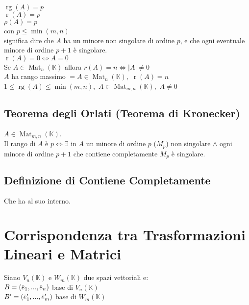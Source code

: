 \documentclass[a4paper, twoside, italian, 11pt]{book}
\newcommand{\detm}[1] {\left | #1 \right |}
\newcommand{\overbar}[1] {\mkern 1.5mu\overline{\mkern-1.5mu#1\mkern-1.5mu}\mkern 1.5mu}
\DeclareMathOperator{\Mat}{Mat}
\DeclareMathOperator{\rg}{rg}
\DeclareMathOperator{\mr}{r}
\newcommand{\K}{\mathbb K}
\begin{document}
\noindent
$\rg(A) = p$ \\
$\mr(A) = p$ \\
$\rho(A) = p$ \\

\noindent
con $p \leq \min(m, n)$ \\

\noindent
significa dire che $A$ ha un minore non singolare di ordine $p$, e che ogni eventuale minore di ordine $p + 1$ è singolare. \\

\noindent
$\mr(A) = 0 \iff A = \underline{0}$ \\

\noindent
Se $A \in \Mat_n(\K)$ allora $r(A) = n \iff \detm A \neq 0$ \\

\noindent
$A$ ha rango massimo $= A \in \Mat_n(\K),$ $\mr(A) = n$ \\

\noindent
$1 \leq \rg(A) \leq \min(m,n),$ $A \in \Mat_{m,n}(\K),$ $A \neq \underline{0}$


\subsection{Teorema degli Orlati (Teorema di Kronecker)}

$A \in \Mat_{m,n}(\K)$.\\
Il rango di $A$ è $p \iff \exists$ in $A$ un minore di ordine $p$ ($M_p$) non singolare $\land$ ogni minore di ordine $p + 1$ che contiene completamente $M_p$ è singolare.


\subsection{Definizione di Contiene Completamente}
Che ha al suo interno.



\section{Corrispondenza tra Trasformazioni Lineari e Matrici}

Siano $V_n(\K)$ e $W_m(\K)$ due spazi vettoriali e: \\

$B = (\overbar e_1, ..., \overbar e_n)$ base di $V_n(\K)$ \\
\indent
$B' = (\overbar e'_1, ..., \overbar e'_m)$ base di $W_m(\K)$ \\
\end{document}
